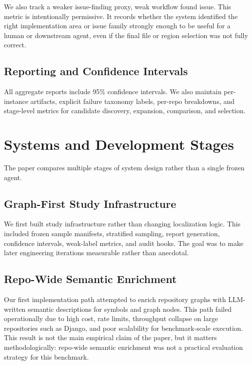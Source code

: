 \documentclass[11pt]{article}
\begin{document}
We also track a weaker issue-finding proxy, weak workflow found issue. This metric is intentionally permissive. It records whether the system identified the right implementation area or issue family strongly enough to be useful for a human or downstream agent, even if the final file or region selection was not fully correct.

\subsection{Reporting and Confidence Intervals}

All aggregate reports include 95\% confidence intervals. We also maintain per-instance artifacts, explicit failure taxonomy labels, per-repo breakdowns, and stage-level metrics for candidate discovery, expansion, comparison, and selection.

\section{Systems and Development Stages}

The paper compares multiple stages of system design rather than a single frozen agent.

\subsection{Graph-First Study Infrastructure}

We first built study infrastructure rather than changing localization logic. This included frozen sample manifests, stratified sampling, report generation, confidence intervals, weak-label metrics, and audit hooks. The goal was to make later engineering iterations measurable rather than anecdotal.

\subsection{Repo-Wide Semantic Enrichment}

Our first implementation path attempted to enrich repository graphs with LLM-written semantic descriptions for symbols and graph nodes. This path failed operationally due to high cost, rate limits, throughput collapse on large repositories such as Django, and poor scalability for benchmark-scale execution. This result is not the main empirical claim of the paper, but it matters methodologically: repo-wide semantic enrichment was not a practical evaluation strategy for this benchmark.
\end{document}
